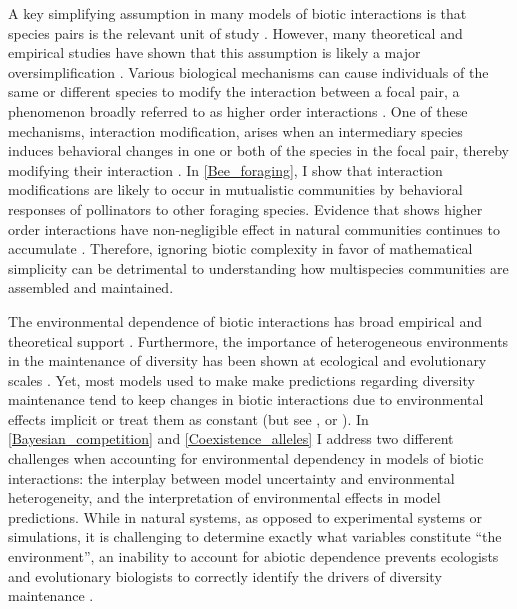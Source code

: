 \begin{refsection}
A key simplifying assumption in many models of biotic interactions is that species pairs is the relevant unit of study \citep{levine_beyond_2017}. However, many theoretical and empirical studies have shown that this assumption is likely a major oversimplification \citep{abrams1983arguments,billick_higher_1994,mayfield2017higher,letten_mechanistic_2019}. Various biological mechanisms can cause individuals of the same or different species to modify the interaction between a focal pair, a phenomenon broadly referred to as higher order interactions \citep{kleinhesselink2019mechanisms}. One of these mechanisms, interaction modification, arises when an intermediary species induces behavioral changes in one or both of the species in the focal pair, thereby modifying their interaction \citep{adler_general_1994, billick_higher_1994}. In \autoref{Bee_foraging}, I show that interaction modifications are likely to occur in mutualistic communities by behavioral responses of pollinators to other foraging species. Evidence that shows higher order interactions have non-negligible effect in natural communities continues to accumulate \citep{mayfield2017higher,martyn2021identifying,lai2020role,levine_beyond_2017}. Therefore, ignoring biotic complexity in favor of mathematical simplicity can be detrimental to understanding how multispecies communities are assembled and maintained.

 The environmental dependence of biotic interactions has broad empirical and theoretical support \citep{callaway_positive_2002,chamberlain_how_2014,lanuza_opposing_2018,chesson2000mechanisms,tylianakis2008global,bimler_accurate_2018}. Furthermore, the importance of heterogeneous environments in the maintenance of diversity has been shown at ecological \citep{amarasekare2003competitive,kneitel2004trade} and evolutionary scales \citep{connallon_evolutionary_2019,ellner1994role,dean2005protecting}. Yet, most models used to make make predictions regarding diversity maintenance tend to keep changes in biotic interactions due to environmental effects implicit or treat them as constant (but see \citet{bimler_accurate_2018}, or \citet{connallon_evolutionary_2019}). In \autoref{Bayesian_competition} and \autoref{Coexistence_alleles} I address two different challenges when accounting for environmental dependency in models of biotic interactions: the interplay between model uncertainty and environmental heterogeneity, and the interpretation of environmental effects in model predictions. While in natural systems, as opposed to experimental systems or simulations, it is challenging to determine exactly what variables constitute ``the environment'', an inability to account for abiotic dependence prevents ecologists and evolutionary biologists to correctly identify the drivers of diversity maintenance \citep{freckleton2009measuring, connallon_evolutionary_2019}.



\end{refsection}
